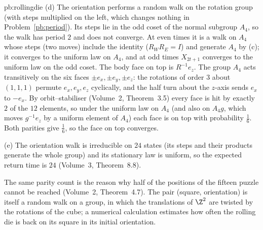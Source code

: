 \begin{solution}{pb:rollingdie}
(d) The orientation performs a random walk on the rotation group (with steps multiplied on the left, which changes nothing in
Problem~\ref{pb:period}). Its steps lie in the odd coset of the normal subgroup $A_4$, so the walk has period $2$ and does not converge. At even
times it is a walk on $A_4$ whose steps (two moves) include the identity ($R_WR_E=I$) and generate $A_4$ by (c); it converges to the uniform law on
$A_4$, and at odd times $X_{2t+1}$ converges to the uniform law on the odd coset. The body face on top is $R^{-1}e_z$. The group $A_4$ acts transitively on
the six faces $\pm e_x,\pm e_y,\pm e_z$: the rotations of order $3$ about $(1,1,1)$ permute $e_x,e_y,e_z$ cyclically, and the half turn about the $z$-axis sends $e_x$
to $-e_x$. By orbit--stabiliser (Volume~2, Theorem~3.5) every face is hit by exactly $2$ of the $12$ elements, so under the uniform law on $A_4$ (and also on
$A_4g$, which moves $g^{-1}e_z$ by a uniform element of $A_4$) each face is on top with probability $\frac16$. Both parities give $\frac16$, so the face on top converges.

(e) The orientation walk is irreducible on $24$ states (its steps and their products generate the whole group) and its stationary law is
uniform, so the expected return time is $24$ (Volume~3, Theorem~8.8).

\leads The same parity count is the reason why half of the positions of the fifteen puzzle cannot be reached (Volume~2, Theorem~4.7).
The pair (square, orientation) is itself a random walk on a group, in which the translations of $\Z^2$ are twisted by the rotations of
the cube; a numerical calculation estimates how often the rolling die is back on its square in its initial orientation.
\end{solution}

